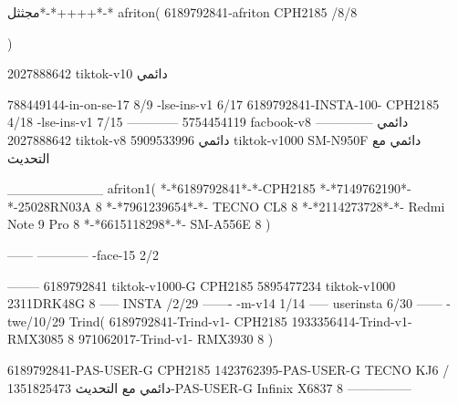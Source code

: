 مجثثل*-*++++*-*
afriton(
6189792841-afriton CPH2185  /8/8

)

2027888642 tiktok-v10
دائمي

788449144-in-on-se-17 8/9
-lse-ins-v1 6/17
6189792841-INSTA-100- CPH2185 4/18
-lse-ins-v1 7/15
------------
5754454119 facbook-v8
دائمي
--------------
2027888642 tiktok-v8
دائمي
5909533996 tiktok-v1000  SM-N950F
دائمي مع التحديث

__________
afriton1(
*-*6189792841*-*-CPH2185
*-*7149762190*-*-25028RN03A  8
*-*7961239654*-*- TECNO CL8  8
*-*2114273728*-*- Redmi Note 9 Pro  8
*-*6615118298*-*- SM-A556E  8
)


------
------------
-face-15 2/2

--------
6189792841 tiktok-v1000-G CPH2185 
5895477234 tiktok-v1000 2311DRK48G 8
-----
 INSTA /2/29
-------
-m-v14 1/14
-----
userinsta 6/30
------
-twe/10/29
Trind(
6189792841-Trind-v1- CPH2185 
1933356414-Trind-v1- RMX3085 8
971062017-Trind-v1- RMX3930 8
)


6189792841-PAS-USER-G CPH2185 
1423762395-PAS-USER-G TECNO KJ6  /دائمي مع التحديث
1351825473-PAS-USER-G Infinix X6837 8
    ---------------
